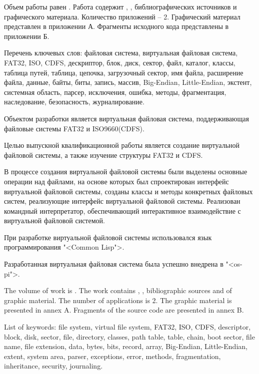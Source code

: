 
Объем работы равен . Работа содержит , ,  библиографических источников и  графического материала. Количество приложений – 2. Графический материал представлен в приложении А. Фрагменты исходного кода представлены в приложении Б.

Перечень ключевых слов: файловая система, виртуальная файловая система, FAT32, ISO, CDFS, дескриптор, блок, диск, сектор, файл, каталог, классы, таблица путей, таблица, цепочка, загрузочный сектор, имя файла, расширение файла, данные, байты, биты, запись, массив, Big-Endian, Little-Endian, экстент, системная область, парсер, исключения, ошибка, методы, фрагментация, наследование, безопасность, журналирование.

Объектом разработки является виртуальная файловая система, поддерживающая файловые системы FAT32 и ISO9660(CDFS).

Целью выпускной квалификационной работы является создание виртуальной файловой системы, а также изучение структуры FAT32 и CDFS.

В процессе создания виртуальной файловой системы были выделены основные операции над файлами, на основе которых был спроектирован интерфейс виртуальной файловой системы, созданы классы и методы конкретных файловых систем, реализующие интерфейс виртуальной файловой системы. Реализован командный интерпретатор, обеспечивающий интерактивное взаимодействие с виртуальной файловой системой.

При разработке виртуальной файловой системы использовался язык программирования "<Common Lisp">.

Разработанная виртуальная файловая система была успешно внедрена в "<os-pi">.

  
The volume of work is . The work contains , ,  bibliographic sources and  of graphic material. The number of applications is 2. The graphic material is presented in annex A. Fragments of the source code are presented in annex B.

List of keywords: file system, virtual file system, FAT32, ISO, CDFS, descriptor, block, disk, sector, file, directory, classes, path table, table, chain, boot sector, file name, file extension, data, bytes, bits, record, array, Big-Endian, Little-Endian, extent, system area, parser, exceptions, error, methods, fragmentation, inheritance, security, journaling.

